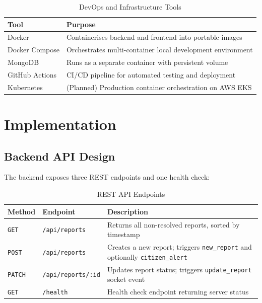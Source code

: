 \documentclass[12pt, a4paper]{report}
\begin{document}
\begin{table}[H]
  \centering
  \caption{DevOps and Infrastructure Tools}
  \begin{tabularx}{\textwidth}{l X}
    \toprule
    \rowcolor{headerrow!20}
    \textbf{Tool} & \textbf{Purpose} \\
    \midrule
    Docker         & Containerises backend and frontend into portable images \\
    \rowcolor{rowshade}
    Docker Compose & Orchestrates multi-container local development environment \\
    MongoDB        & Runs as a separate container with persistent volume \\
    \rowcolor{rowshade}
    GitHub Actions & CI/CD pipeline for automated testing and deployment \\
    Kubernetes     & (Planned) Production container orchestration on AWS EKS \\
    \bottomrule
  \end{tabularx}
\end{table}

\chapter{Implementation}

\section{Backend API Design}

The backend exposes three REST endpoints and one health check:

\begin{table}[H]
  \centering
  \caption{REST API Endpoints}
  \begin{tabularx}{\textwidth}{l l X}
    \toprule
    \rowcolor{headerrow!20}
    \textbf{Method} & \textbf{Endpoint} & \textbf{Description} \\
    \midrule
    \texttt{GET}   & \texttt{/api/reports}     & Returns all non-resolved reports, sorted by timestamp \\
    \rowcolor{rowshade}
    \texttt{POST}  & \texttt{/api/reports}     & Creates a new report; triggers \texttt{new\_report} and optionally \texttt{citizen\_alert} \\
    \texttt{PATCH} & \texttt{/api/reports/:id} & Updates report status; triggers \texttt{update\_report} socket event \\
    \rowcolor{rowshade}
    \texttt{GET}   & \texttt{/health}          & Health check endpoint returning server status \\
    \bottomrule
  \end{tabularx}
\end{table}
\end{document}
